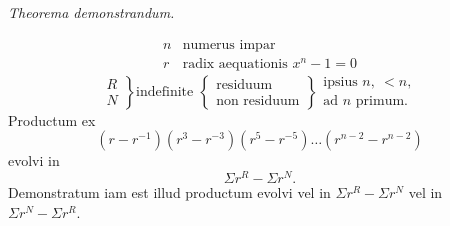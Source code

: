 \NoSourceHead
{}
\bigskip
{}
\begin{center}\textit{Theorema demonstrandum.}\end{center}
\[
\begin{array}{rl}
n&\text{numerus impar}\\
r&\text{radix aequationis }x^n-1=0
\end{array}
\]
\[
\left.\begin{array}{c}R\\N\end{array}\right\}
\text{indefinite }
\left\{\begin{array}{l}\text{residuum}\\\text{non residuum}\end{array}\right\}
\begin{array}{l}\text{ipsius }n,\ <n,\\\text{ad }n\text{ primum.}\end{array}
\]
\noindent Productum ex
\[
(r-r^{-1})(r^3-r^{-3})(r^5-r^{-5})\ldots(r^{n-2}-r^{n-2})
\]
\noindent evolvi in
\[
\Sigma r^R-\Sigma r^N.
\]
\noindent Demonstratum iam est illud productum evolvi vel in $\Sigma r^R-\Sigma r^N$ vel in $\Sigma r^N-\Sigma r^R$.
\ClosingRule
\clearpage

